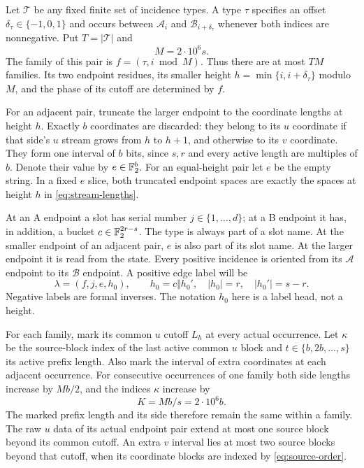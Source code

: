 Let $\mathcal T$ be any fixed finite set of incidence types.  A type
$\tau$ specifies an offset $\delta_\tau\in\{-1,0,1\}$ and occurs between
$\mathscr A_i$ and $\mathscr B_{i+\delta_\tau}$ whenever both indices are
nonnegative.  Put $T=|\mathcal T|$ and
\begin{equation}\label{eq:family-modulus}
 M=2\cdot10^6s.
\end{equation}
The family of this pair is $f=(\tau,i\bmod M)$.  Thus there are at most
$TM$ families.  Its two endpoint residues, its smaller height
$h=\min\{i,i+\delta_\tau\}$ modulo $M$, and the phase of its cutoff are
determined by $f$.

For an adjacent pair, truncate the larger endpoint to the coordinate
lengths at height $h$.  Exactly $b$ coordinates are discarded: they belong
to its $u$ coordinate if that side's $u$ stream grows from $h$ to $h+1$,
and otherwise to its $v$ coordinate.  They form one interval of $b$ bits,
since $s,r$ and every active length are multiples of $b$.  Denote their
value by $e\in\mathbb F_2^b$.  For an equal-height pair let $e$ be the empty
string.  In a fixed $e$ slice, both truncated endpoint spaces are exactly
the spaces at height $h$ in \eqref{eq:stream-lengths}.

At an A endpoint a slot has serial number $j\in\{1,\ldots,d\}$; at a B
endpoint it has, in addition, a bucket $c\in\mathbb F_2^{2r-s}$.  The type is
always part of a slot name.  At the smaller endpoint of an adjacent pair,
$e$ is also part of its slot name.  At the larger endpoint it is read from
the state.  Every positive incidence is oriented from its $\mathscr A$ endpoint to
its $\mathscr B$ endpoint. A positive edge label will be
\begin{equation}\label{eq:positive-label}
 \lambda=(f,j,e,h_0),\qquad h_0=c\Vert h_0',\quad
 |h_0|=r,\quad |h_0'|=s-r.
\end{equation}
Negative labels are formal inverses.  The notation $h_0$ here is a label
head, not a height.

For each family, mark its common $u$ cutoff $L_h$ at every actual
occurrence.  Let $\kappa$ be the source-block index of the last active
common $u$ block and $t\in\{b,2b,\ldots,s\}$ its active prefix length.
Also mark the interval of extra coordinates at each adjacent occurrence.
For consecutive occurrences of one family both side lengths increase by
$Mb/2$, and the indices $\kappa$ increase by
\begin{equation}\label{eq:mark-spacing}
 K=Mb/s=2\cdot10^6b.
\end{equation}
The marked prefix length and its side therefore remain the same within
a family.  The raw $u$ data of its actual endpoint pair extend at most
one source block beyond its common cutoff.  An extra $v$ interval lies
at most two source blocks beyond that cutoff, when its coordinate blocks
are indexed by \eqref{eq:source-order}.

